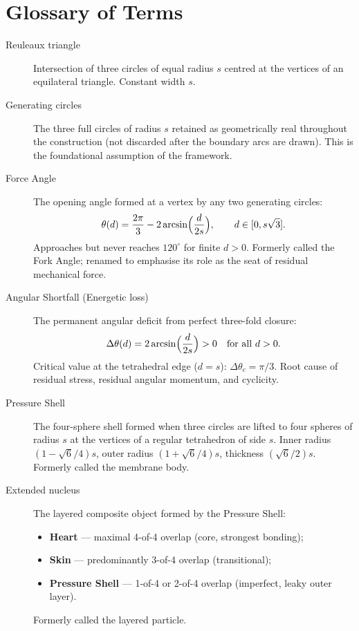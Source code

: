 \section{Glossary of Terms}
\label{app:glossary}

\begin{description}
\item[Reuleaux triangle]
Intersection of three circles of equal radius $s$ centred at the vertices of an
equilateral triangle. Constant width $s$.

\item[Generating circles]
The three full circles of radius $s$ retained as geometrically real throughout
the construction (not discarded after the boundary arcs are drawn). This is the
foundational assumption of the framework.

\item[Force Angle]
The opening angle formed at a vertex by any two generating circles:
\[
\theta(d)=\frac{2\pi}{3}-2\arcsin\Bigl(\frac{d}{2s}\Bigr),\qquad d\in[0,s\sqrt{3}].
\]
Approaches but never reaches $120^\circ$ for finite $d>0$. Formerly called the
Fork Angle; renamed to emphasise its role as the seat of residual mechanical force.

\item[Angular Shortfall (Energetic loss)]
The permanent angular deficit from perfect three-fold closure:
\[
\Delta\theta(d)=2\arcsin\Bigl(\frac{d}{2s}\Bigr)>0\quad\text{for all }d>0.
\]
Critical value at the tetrahedral edge ($d=s$): $\Delta\theta_c=\pi/3$.
Root cause of residual stress, residual angular momentum, and cyclicity.

\item[Pressure Shell]
The four-sphere shell formed when three circles are lifted to four spheres of
radius $s$ at the vertices of a regular tetrahedron of side $s$. Inner radius
$(1-\sqrt{6}/4)s$, outer radius $(1+\sqrt{6}/4)s$, thickness $(\sqrt{6}/2)s$.
Formerly called the membrane body.

\item[Extended nucleus]
The layered composite object formed by the Pressure Shell:
\begin{itemize}
\item \textbf{Heart} --- maximal 4-of-4 overlap (core, strongest bonding);
\item \textbf{Skin} --- predominantly 3-of-4 overlap (transitional);
\item \textbf{Pressure Shell} --- 1-of-4 or 2-of-4 overlap (imperfect, leaky outer layer).
\end{itemize}
Formerly called the layered particle.


\end{description}
